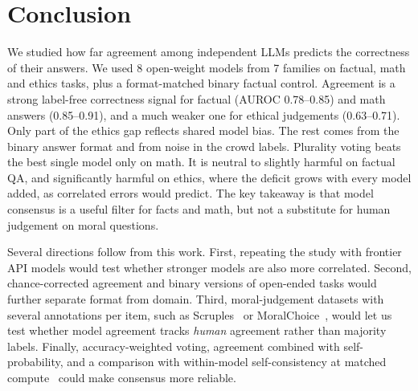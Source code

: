 \section{Conclusion}
\label{sec:conclusion}

We studied how far agreement among independent LLMs predicts the correctness of their answers.
We used 8 open-weight models from 7 families on factual, math and ethics tasks, plus a format-matched binary factual control.
Agreement is a strong label-free correctness signal for factual (AUROC 0.78--0.85) and math answers (0.85--0.91), and a much weaker one for ethical judgements (0.63--0.71).
Only part of the ethics gap reflects shared model bias.
The rest comes from the binary answer format and from noise in the crowd labels.
Plurality voting beats the best single model only on math.
It is neutral to slightly harmful on factual QA, and significantly harmful on ethics, where the deficit grows with every model added, as correlated errors would predict.
The key takeaway is that model consensus is a useful filter for facts and math, but not a substitute for human judgement on moral questions.

Several directions follow from this work.
First, repeating the study with frontier API models would test whether stronger models are also more correlated.
Second, chance-corrected agreement and binary versions of open-ended tasks would further separate format from domain.
Third, moral-judgement datasets with several annotations per item, such as Scruples~\citep{lourie2021scruples} or MoralChoice~\citep{scherrer2023moralchoice}, would let us test whether model agreement tracks {\em human} agreement rather than majority labels.
Finally, accuracy-weighted voting, agreement combined with self-probability, and a comparison with within-model self-consistency at matched compute~\citep{wang2023selfconsistency} could make consensus more reliable.
